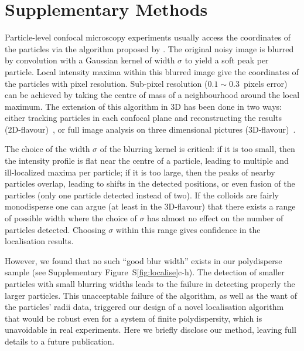 \documentclass[reprint,notitlepage]{revtex4-1}
\begin{document}
\section*{Supplementary Methods}



Particle-level confocal microscopy experiments usually access the coordinates of the particles via the algorithm proposed by \citet{Crocker1996}. The original noisy image is blurred by convolution with a Gaussian kernel of width $\sigma$ to yield a soft peak per particle. Local intensity maxima within this blurred image give the coordinates of the particles with pixel resolution. Sub-pixel resolution ($0.1\sim0.3$~pixels error) can be achieved by taking the centre of mass of a neighbourhood around the local maximum. The extension of this algorithm in 3D has been done in two ways: either tracking particles in each confocal plane and reconstructing the results (2D-flavour)~\citep{dinsmore2001tdc}, or full image analysis on three dimensional pictures (3D-flavour)~\citep{vanblaaderen1995rss, Lu2007}.

The choice of the width $\sigma$ of the blurring kernel is critical: if it is too small, then the intensity profile is flat near the centre  of a particle, leading to multiple and ill-localized maxima per particle; if it is too large, then the peaks of nearby particles overlap, leading to shifts in the detected positions, or even fusion of the particles (only one particle detected instead of two). If the colloids are fairly monodisperse one can argue (at least in the 3D-flavour) that there exists a range of possible width where the choice of $\sigma$ has almost no effect on the number of particles detected. Choosing $\sigma$ within this range gives confidence in the localisation results.



However, we found that no such ``good blur width'' exists in our polydisperse sample (see Supplementary Figure~S\ref{fig:localise}c-h). The detection of smaller particles with small blurring widths leads to the failure in detecting properly the larger particles. This unacceptable failure of the \citet{Crocker1996} algorithm, as well as the want of the particles' radii data, triggered our design of a novel localisation algorithm that would be robust even for a system of finite polydispersity, which is unavoidable in real experiments. Here we briefly disclose our method, leaving full details to a future publication.
\end{document}
